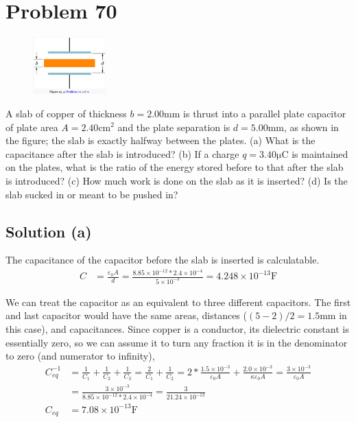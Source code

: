 \documentclass[12pt]{article}
\begin{document}
\section*{Problem 70}
\begin{figure}
    \vspace{-30pt}
    \includegraphics[width=0.25\textwidth]{image.png} 
\end{figure}
A slab of copper of thickness $b = 2.00\unit{\milli\meter}$ is thrust into a parallel plate capacitor of plate area $A = 2.40 \unit{\centi\meter^2}$ and the plate separation is $d = 5.00 \unit{\milli\meter}$, as shown in the figure; the slab is exactly halfway between the plates. 
(a) What is the capacitance after the slab is introduced? 
(b) If a charge $q = 3.40\unit{\micro\coulomb}$ is maintained on the plates, what is the ratio of the energy stored before to that after the slab is introduced? 
(c) How much work is done on the slab as it is inserted? 
(d) Is the slab sucked in or meant to be pushed in?

\subsection*{Solution (a)}
The capacitance of the capacitor before the slab is inserted is calculatable.
\begin{align*}
    C   &=  \frac{\varepsilon_0 A}{d}
        =   \frac{8.85 \times 10^{-12} * 2.4 \times 10^{-4}}{5 \times 10^{-3}}
        =   4.248 \times 10^{-13} \unit{\farad}
\end{align*}

We can treat the capacitor as an equivalent to three different capacitors. 
The first and last capacitor would have the same areas, distances ($(5 - 2) / 2 = 1.5 \unit{\milli\meter}$ in this case), and capacitances.
Since copper is a conductor, its dielectric constant is essentially zero, so we can assume it to turn any fraction it is in the denominator to zero (and numerator to infinity),
\begin{align*}
    C_{eq}^{-1} &=  \frac{1}{C_1} + \frac{1}{C_2} + \frac{1}{C_3}
        =   \frac{2}{C_1} + \frac{1}{C_2}
        =   2*\frac{1.5 \times 10^{-3}}{\varepsilon_0 A} + \frac{2.0 \times 10^{-3}}{\kappa \varepsilon_0 A}
        =   \frac{3 \times 10^{-3}}{\varepsilon_0 A}\\
        &=  \frac{3 \times 10^{-3}}{8.85 \times 10^{-12} * 2.4 \times 10^{-4}}
        =   \frac{3}{21.24 \times 10^{-13}}\\
    C_{eq}  &=  \boxed{7.08 \times 10^{-13} \unit{\farad}}
\end{align*}
\end{document}
